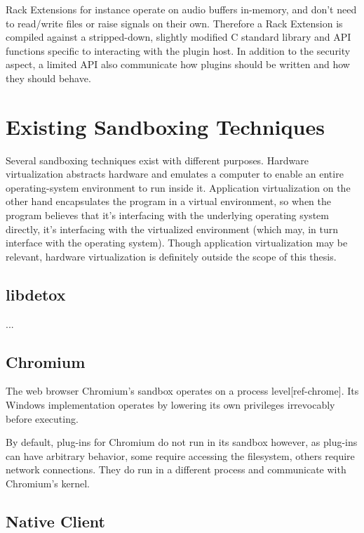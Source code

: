 Rack Extensions for instance operate on audio buffers in-memory, and don't need
to read/write files or raise signals on their own. Therefore a Rack Extension is
compiled against a stripped-down, slightly modified C standard library and API
functions specific to interacting with the plugin host. In addition to the
security aspect, a limited API also communicate how plugins should be written
and how they should behave.


\section {Existing Sandboxing Techniques}

Several sandboxing techniques exist with different purposes. Hardware
virtualization abstracts hardware and emulates a computer to enable an entire
operating-system environment to run inside it. Application virtualization on the
other hand encapsulates the program in a virtual environment, so when the
program believes that it's interfacing with the underlying operating system
directly, it's interfacing with the virtualized environment (which may, in turn
interface with the operating system). Though application virtualization may be
relevant, hardware virtualization is definitely outside the scope of this
thesis.

\subsection {libdetox}

...

\subsection {Chromium}

The web browser Chromium's sandbox operates on a process level[ref-chrome]. Its
Windows implementation operates by lowering its own privileges irrevocably
before executing.

By default, plug-ins for Chromium do not run in its sandbox however, as
plug-ins can have arbitrary behavior, some require accessing the filesystem,
others require network connections. They do run in a different process and
communicate with Chromium's kernel.

\subsection {Native Client}


